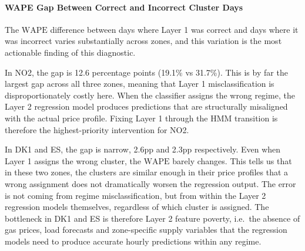\documentclass[12pt, a4paper]{article}
\newcommand{\WAPE}{\text{WAPE}}
\begin{document}

\paragraph{WAPE Gap Between Correct and Incorrect Cluster Days}

The $\WAPE$ difference between days where Layer 1 was correct and days where it
was incorrect varies substantially across zones, and this variation is the most
actionable finding of this diagnostic.

In NO2, the gap is 12.6 percentage points (19.1\% vs 31.7\%). This is by far the
largest gap across all three zones, meaning that Layer 1 misclassification is
disproportionately costly here. When the classifier assigns the wrong regime, the
Layer 2 regression model produces predictions that are structurally misaligned with
the actual price profile. Fixing Layer 1 through the HMM transition is therefore
the highest-priority intervention for NO2.

In DK1 and ES, the gap is narrow, 2.6pp and 2.3pp respectively. Even when Layer 1
assigns the wrong cluster, the $\WAPE$ barely changes. This tells us that in these
two zones, the clusters are similar enough in their price profiles that a wrong
assignment does not dramatically worsen the regression output. The error is not
coming from regime misclassification, but from within the Layer 2 regression
models themselves, regardless of which cluster is assigned. The bottleneck in DK1
and ES is therefore Layer 2 feature poverty, i.e.\ the absence of gas prices, load
forecasts and zone-specific supply variables that the regression models need to
produce accurate hourly predictions within any regime.

\end{document}
